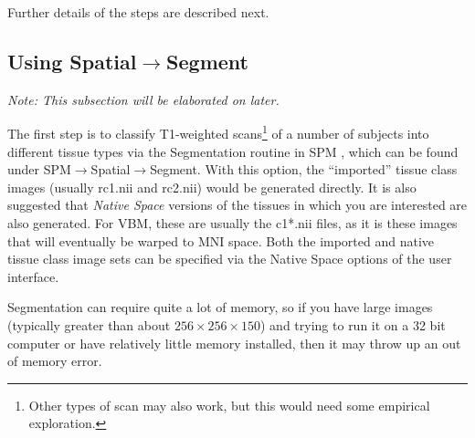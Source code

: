 Further details of the steps are described next.


\subsection{Using Spatial$\rightarrow$Segment}
\emph{Note: This subsection will be elaborated on later.}

The first step is to classify T1-weighted scans\footnote{Other types of scan may also work, but this would need some empirical exploration.} of a number of subjects into different tissue types via the Segmentation routine in SPM \cite{ashburner05}, which can be found under SPM$\rightarrow$Spatial$\rightarrow$Segment.
With this option, the ``imported'' tissue class images (usually rc1.nii and rc2.nii) would be generated directly.
It is also suggested that \emph{Native Space} versions of the tissues in which you are interested are also generated.
For VBM, these  are usually the c1*.nii files, as it is these images that will eventually be warped to MNI space.
Both the imported and native tissue class image sets can be specified via the Native Space options of the user interface.

Segmentation can require quite a lot of memory, so if you have large images (typically greater than about $256\times256\times150$) and trying to run it on a 32 bit computer or have relatively little memory installed, then it may throw up an out of memory error.
 
